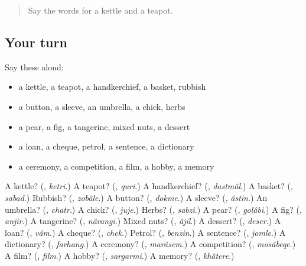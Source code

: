 \begin{quote}
Say the words for a kettle and a teapot.
\end{quote}

\subsection*{Your turn}
Say these aloud:

\begin{itemize}
\raggedright
  \item a kettle, a teapot, a handkerchief, a basket, rubbish
  \item a button, a sleeve, an umbrella, a chick, herbs
  \item a pear, a fig, a tangerine, mixed nuts, a dessert
  \item a loan, a cheque, petrol, a sentence, a dictionary
  \item a ceremony, a competition, a film, a hobby, a memory
\end{itemize}

\begin{tcolorbox}[breakable,colback=teal!4,colframe=teal!35!black,title={Before you move on}]
A kettle? (\textbf{}, \emph{ketri}.) A teapot? (\textbf{}, \emph{quri}.) A handkerchief? (\textbf{}, \emph{dastmâl}.) A basket? (\textbf{}, \emph{sabad}.) Rubbish? (\textbf{}, \emph{zobâle}.) A button? (\textbf{}, \emph{dokme}.) A sleeve? (\textbf{}, \emph{âstin}.) An umbrella? (\textbf{}, \emph{chatr}.) A chick? (\textbf{}, \emph{juje}.) Herbs? (\textbf{}, \emph{sabzi}.) A pear? (\textbf{}, \emph{golâbi}.) A fig? (\textbf{}, \emph{anjir}.) A tangerine? (\textbf{}, \emph{nârangi}.) Mixed nuts? (\textbf{}, \emph{âjil}.) A dessert? (\textbf{}, \emph{deser}.) A loan? (\textbf{}, \emph{vâm}.) A cheque? (\textbf{}, \emph{chek}.) Petrol? (\textbf{}, \emph{benzin}.) A sentence? (\textbf{}, \emph{jomle}.) A dictionary? (\textbf{}, \emph{farhang}.) A ceremony? (\textbf{}, \emph{marâsem}.) A competition? (\textbf{}, \emph{mosâbeqe}.) A film? (\textbf{}, \emph{film}.) A hobby? (\textbf{}, \emph{sargarmi}.) A memory? (\textbf{}, \emph{khâtere}.)
\end{tcolorbox}
